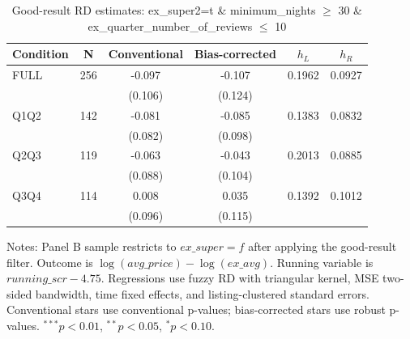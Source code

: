 \begin{table}[!htbp]
\centering
\caption{Good-result RD estimates: ex\_super2=t \& minimum\_nights $\geq$ 30 \& ex\_quarter\_number\_of\_reviews $\leq$ 10}
\label{tab:good_result_min_nights_30_reviews_10}
\begin{tabular}{lccccc}
\hline
Condition & N & Conventional & Bias-corrected & $h_L$ & $h_R$ \\
\hline
FULL & 256 & -0.097 & -0.107 & 0.1962 & 0.0927 \\
 &  & (0.106) & (0.124) &  &  \\
Q1Q2 & 142 & -0.081 & -0.085 & 0.1383 & 0.0832 \\
 &  & (0.082) & (0.098) &  &  \\
Q2Q3 & 119 & -0.063 & -0.043 & 0.2013 & 0.0885 \\
 &  & (0.088) & (0.104) &  &  \\
Q3Q4 & 114 & 0.008 & 0.035 & 0.1392 & 0.1012 \\
 &  & (0.096) & (0.115) &  &  \\
\hline
\end{tabular}
\begin{flushleft}
\footnotesize Notes: Panel B sample restricts to $ex\_super=f$ after applying the good-result filter. Outcome is $\log(avg\_price)-\log(ex\_avg)$. Running variable is $running\_scr-4.75$. Regressions use fuzzy RD with triangular kernel, MSE two-sided bandwidth, time fixed effects, and listing-clustered standard errors. Conventional stars use conventional p-values; bias-corrected stars use robust p-values. $^{***}p<0.01$, $^{**}p<0.05$, $^{*}p<0.10$.
\end{flushleft}
\end{table}

